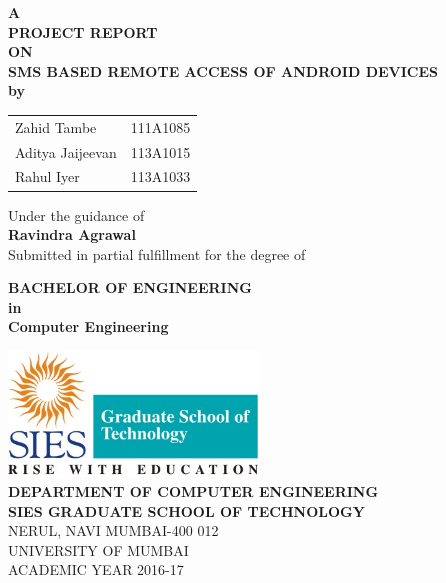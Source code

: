 

\begin{titlepage}
\begin{center}
\textup{\small {\bf A } \\
	 \textbf{PROJECT REPORT}}\\
 \small\textbf{ON}\\[0.3in]

\Large \textbf {SMS BASED REMOTE ACCESS OF ANDROID DEVICES}\\[0.2in]
\small \textbf{by}\\

\begin{table}[h]
	\centering
	\begin{tabular}{lr} 
		Zahid Tambe &  111A1085 \\
		Aditya Jaijeevan &  113A1015 \\
		Rahul Iyer &  113A1033 \\   
	\end{tabular}
\end{table}

\vspace{.1in}
Under the guidance of\\
{\textbf{Ravindra Agrawal}}\\[0.2in]

       Submitted in partial fulfillment for the degree of
        \vspace{.2in}

       {\bf BACHELOR OF ENGINEERING \\in\\ Computer Engineering}\\[0.5in]

\vfill

\includegraphics[width=0.5\textwidth]{SIES_GST}\\[0.3in]

\textbf{DEPARTMENT OF COMPUTER ENGINEERING}\\
\normalsize
\textbf{SIES GRADUATE SCHOOL OF TECHNOLOGY}\\
\vspace{0.2cm}
NERUL, NAVI MUMBAI-400 012\\

UNIVERSITY OF MUMBAI\\
ACADEMIC YEAR 2016-17

\end{center}

\end{titlepage}

